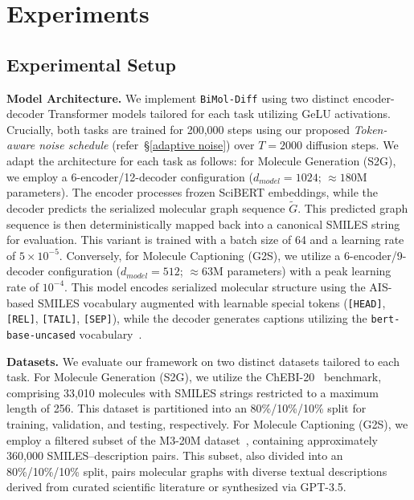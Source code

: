 \section{Experiments} \label{experiments}

\subsection{Experimental Setup}
\noindent \textbf{Model Architecture.} We implement \texttt{BiMol-Diff} using two distinct encoder-decoder Transformer models tailored for each task utilizing GeLU activations. Crucially, both tasks are trained for 200,000 steps using our proposed \textit{Token-aware noise schedule} (refer~\S\ref{adaptive noise}) over $T=2000$ diffusion steps. We adapt the architecture for each task as follows: for Molecule Generation (S2G), we employ a 6-encoder/12-decoder configuration ($d_{model}=1024$; $\approx 180$M parameters). The encoder processes
frozen SciBERT embeddings, while the decoder predicts the serialized
molecular graph sequence \(\tilde{G}\). This predicted graph sequence is
then deterministically mapped back into a canonical SMILES string for
evaluation. This variant is trained with a batch size of 64 and a learning rate of $5 \times 10^{-5}$. Conversely, for Molecule Captioning (G2S), we utilize a 6-encoder/9-decoder configuration ($d_{model}=512$; $\approx 63$M parameters) with a peak learning rate of $10^{-4}$. This model encodes serialized molecular structure using the AIS-based SMILES vocabulary augmented with learnable special tokens (\texttt{[HEAD]}, \texttt{[REL]}, \texttt{[TAIL]}, \texttt{[SEP]}), while the decoder generates captions utilizing the \texttt{bert-base-uncased} vocabulary~\cite{devlin-etal-2019-bert}.

\noindent \textbf{Datasets.} We evaluate our framework on two distinct datasets tailored to each task. For Molecule Generation (S2G), we utilize the ChEBI-20~\citep{edwards-etal-2022-translation} benchmark, comprising 33,010 molecules with SMILES strings restricted to a maximum length of 256. This dataset is partitioned into an 80\%/10\%/10\% split for training, validation, and testing, respectively. For Molecule Captioning (G2S), we employ a filtered subset of the M3-20M dataset~\cite{guo2025m320mlargescalemultimodalmolecule}, containing approximately 360,000 SMILES--description pairs. This subset, also divided into an 80\%/10\%/10\% split, pairs molecular graphs with diverse textual descriptions derived from curated scientific literature or synthesized via GPT-3.5.


